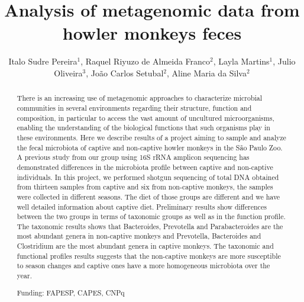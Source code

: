 \documentclass[twoside]{article}
\title{\vspace{-15mm}\fontsize{24pt}{10pt}\selectfont\textbf{Analysis of metagenomic data from howler monkeys feces}} %
\author{Italo Sudre Pereira$^1$, Raquel Riyuzo de Almeida Franco$^2$, Layla Martins$^1$, Julio Oliveira$^3$, Jo\~ao Carlos Setubal$^2$, Aline Maria da Silva$^2$}
\affil{1 USP\\ 2 UNIFESP\\ }
\date{}
\begin{document}
\maketitle %

\thispagestyle{fancy} %


\begin{abstract}
There is an increasing use of metagenomic approaches to characterize microbial communities in several environments regarding their structure, function and composition, in particular to access the vast amount of uncultured microorganisms, enabling the understanding of the biological functions that such organisms play in these environments. Here we describe results of a project aiming to sample and analyze the fecal microbiota of captive and non-captive howler monkeys in the S\~ao Paulo Zoo. A previous study from our group using 16S rRNA amplicon sequencing has demonstrated differences in the microbiota profile between captive and non-captive individuals. In this project, we performed shotgun sequencing of total DNA obtained from thirteen samples from captive and six from non-captive monkeys, the samples were collected in different seasons. The diet of those groups are different and we have well detailed information about captive diet. Preliminary results show differences between the two groups in terms of taxonomic groups as well as in the function profile. The taxonomic results shows that Bacteroides, Prevotella and Parabacteroides are the most abundant genera in non-captive monkeys and Prevotella, Bacteroides and Clostridium are the most abundant genera in captive monkeys. The taxonomic and functional profiles results suggests that the non-captive monkeys are more susceptible to season changes and captive ones have a more homogeneous microbiota over the year.

Funding: FAPESP, CAPES, CNPq
\end{abstract}
\end{document}
